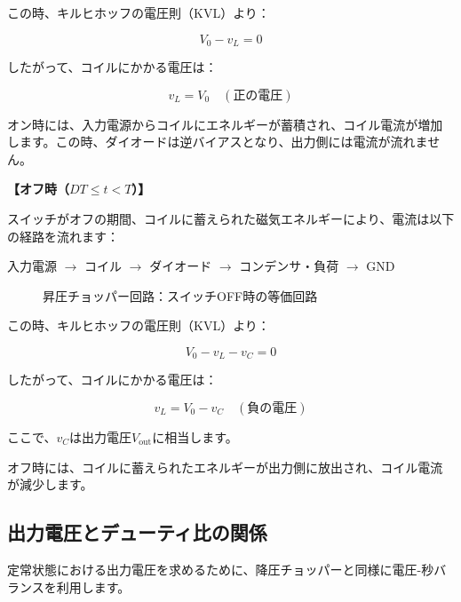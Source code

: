 この時、キルヒホッフの電圧則（KVL）より：

\begin{equation}
V_0 - v_L = 0
\end{equation}

したがって、コイルにかかる電圧は：

\begin{equation}
v_L = V_0 \quad (\text{正の電圧})
\end{equation}

オン時には、入力電源からコイルにエネルギーが蓄積され、コイル電流が増加します。この時、ダイオードは逆バイアスとなり、出力側には電流が流れません。

\textbf{【オフ時（$DT \le t < T$）】}

スイッチがオフの期間、コイルに蓄えられた磁気エネルギーにより、電流は以下の経路を流れます：

\begin{center}
入力電源 $\rightarrow$ コイル $\rightarrow$ ダイオード $\rightarrow$ コンデンサ・負荷 $\rightarrow$ GND
\end{center}

\begin{figure}[H]
\centering
{}
\caption{昇圧チョッパー回路：スイッチOFF時の等価回路}
\label{fig:ch05_boost_off}
\end{figure}

この時、キルヒホッフの電圧則（KVL）より：

\begin{equation}
V_0 - v_L - v_C = 0
\end{equation}

したがって、コイルにかかる電圧は：

\begin{equation}
v_L = V_0 - v_C \quad (\text{負の電圧})
\end{equation}

ここで、$v_C$は出力電圧$V_{\text{out}}$に相当します。

オフ時には、コイルに蓄えられたエネルギーが出力側に放出され、コイル電流が減少します。

\subsection{出力電圧とデューティ比の関係}

定常状態における出力電圧を求めるために、降圧チョッパーと同様に電圧-秒バランスを利用します。


